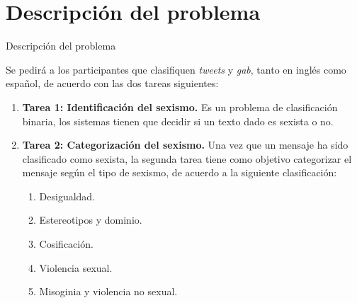 \documentclass[10pt]{beamer}
\begin{document}
\section{Descripción del problema}
\begin{frame}{Descripción del problema}
\justify
\small

Se pedirá a los participantes que clasifiquen \emph{tweets} y \emph{gab}, tanto en inglés como español, de acuerdo con las dos tareas siguientes:

\begin{enumerate}
\item \textbf{Tarea 1: Identificación del sexismo.} Es un problema de clasificación binaria, los sistemas tienen que decidir si un texto dado es sexista o no.

\item \textbf{Tarea 2: Categorización del sexismo.} Una vez que un mensaje ha sido clasificado como sexista, la segunda tarea tiene como objetivo categorizar el mensaje según el tipo de sexismo, de acuerdo a la siguiente clasificación:

\begin{enumerate}
\item Desigualdad.
\item Estereotipos y dominio.
\item Cosificación.
\item Violencia sexual.
\item Misoginia y violencia no sexual.
\end{enumerate}

\end{enumerate}

\end{frame}
\end{document}
